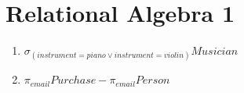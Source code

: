 \documentclass{article}
\begin{document}
\section*{Relational Algebra 1}

\begin{enumerate}
    \item
          $
              \sigma_{(instrument=piano \lor instrument=violin)}Musician
          $
    \item $ \pi_{email}Purchase - \pi_{email}Person$
\end{enumerate}
\end{document}
